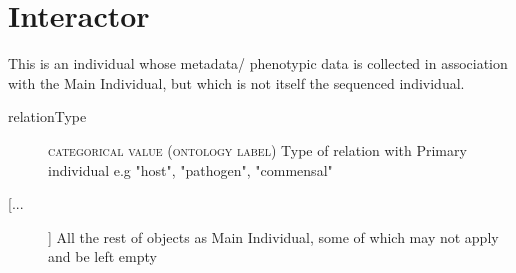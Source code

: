 \documentclass[a4paper, 10pt]{article}        %
\begin{document}
 \section*{{\color{teal} Interactor}}
This is an individual whose metadata/ phenotypic data is collected in association with the Main Individual, but which is not itself the sequenced individual.
\begin{description}
	\item[relationType] {\textsc{categorical value (ontology label)}} Type of relation with Primary individual e.g "host", "pathogen", "commensal"
	\item[[...]] All the rest of objects as Main Individual, some of which may not apply and be left empty
\end{description}
 
 
\end{document}
